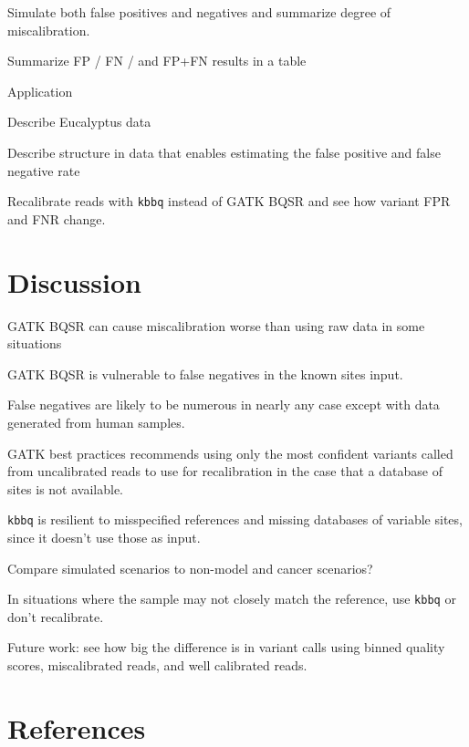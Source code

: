 \documentclass{article}
\begin{document}
\begin{outline}
\begin{outline}
	\end{outline}	
	\item Simulate both false positives and negatives and summarize degree of miscalibration.
	\item Summarize FP / FN / and FP+FN results in a table
	\item Application
	\begin{outline}
		\item Describe Eucalyptus data
		\item Describe structure in data that enables estimating the false positive and false negative rate
		\item Recalibrate reads with \texttt{kbbq} instead of GATK BQSR and see how variant FPR and FNR change.
	\end{outline}
\end{outline}
\section{Discussion}
\begin{outline}
	\item GATK BQSR can cause miscalibration worse than using raw data in some situations
	\item GATK BQSR is vulnerable to false negatives in the known sites input.
	\begin{outline}
		\item False negatives are likely to be numerous \parencite{bobo_false_2016} in nearly any case except with data generated from human samples.
		\item GATK best practices recommends using only the most confident variants called from uncalibrated reads to use for recalibration in the case that a database of sites is not available.
	\end{outline}
	\item \texttt{kbbq} is resilient to misspecified references and missing databases of variable sites, since it doesn't use those as input.
	\item Compare simulated scenarios to non-model and cancer scenarios?
	\begin{outline}
		\item In situations where the sample may not closely match the reference, use \texttt{kbbq} or don't recalibrate.
	\end{outline}
	\item Future work: see how big the difference is in variant calls using binned quality scores, miscalibrated reads, and well calibrated reads.
\end{outline}

\section{References}

\printbibliography
\end{document}
